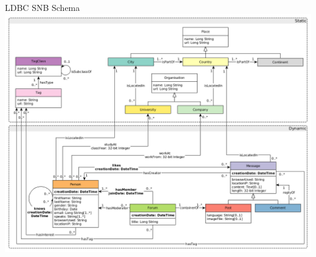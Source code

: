 \documentclass[rgb]{beamer}
\begin{document}
        \begin{frame}{LDBC SNB Schema}
        \centering
        \includegraphics[keepaspectratio,width=\textwidth, height=0.95\textheight]{img/ldbc_snb.png}
        \end{frame}
 
\end{document}
